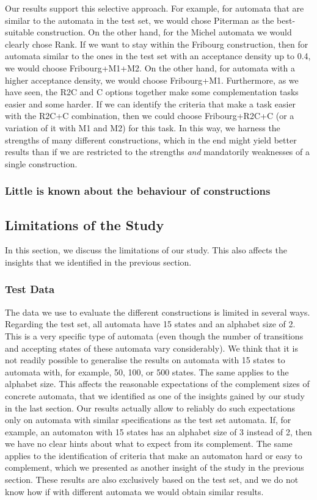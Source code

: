 Our results support this selective approach. For example, for automata that are similar to the automata in the \goal{} test set, we would chose Piterman as the best-suitable construction. On the other hand, for the Michel automata we would clearly chose Rank. If we want to stay within the Fribourg construction, then for automata similar to the ones in the \goal{} test set with an acceptance density up to 0.4, we would choose Fribourg+M1+M2. On the other hand, for automata with a higher acceptance density, we would choose Fribourg+M1. Furthermore, as we have seen, the R2C and C options together make some complementation tasks easier and some harder. If we can identify the criteria that make a task easier with the R2C+C combination, then we could choose Fribourg+R2C+C (or a variation of it with M1 and M2) for this task. In this way, we harness the strengths of many different constructions, which in the end might yield better results than if we are restricted to the strengths \textit{and} mandatorily weaknesses of a single construction.

\subsubsection{Little is known about the behaviour of constructions}





\subsection{Limitations of the Study}
\label{5_limitations}
In this section, we discuss the limitations of our study. This also affects the insights that we identified in the previous section.


\subsubsection{Test Data}
The data we use to evaluate the different constructions is limited in several ways. Regarding the \goal{} test set, all automata have 15 states and an alphabet size of 2. This is a very specific type of automata (even though the number of transitions and accepting states of these automata vary considerably). We think that it is not readily possible to generalise the results on automata with 15 states to automata with, for example, 50, 100, or 500 states. The same applies to the alphabet size. This affects the reasonable expectations of the complement sizes of concrete automata, that we identified as one of the insights gained by our study in the last section. Our results actually allow to reliably do such expectations only on automata with similar specifications as the \goal{} test set automata. If, for example, an automaton with 15 states has an alphabet size of 3 instead of 2, then we have no clear hints about what to expect from its complement. The same applies to the identification of criteria that make an automaton hard or easy to complement, which we presented as another insight of the study in the previous section. These results are also exclusively based on the \goal{} test set, and we do not know how if with different automata we would obtain similar results.

